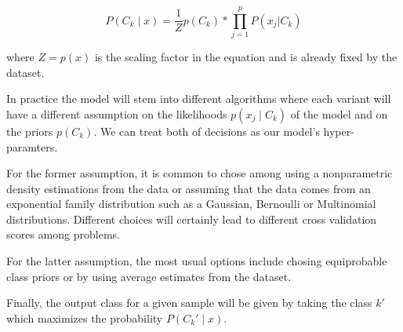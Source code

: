 \documentclass{article}%
\theoremstyle{definition}
\begin{document}
\[
P(C_k \mid x) = \frac{1}{Z} p(C_k) * \prod_{j=1}^{p}    P(x_j | C_k)
\]\label{equation-posteriorProbabilityDecomposition3}

where $Z = p(x)$ is the scaling factor in the equation and is already fixed by the dataset.

In practice the model will stem into different algorithms where each variant will have a different assumption on the likelihoods $p(x_j \mid C_k)$ of the model and on the priors $p(C_k)$. We can treat both of decisions as our model's hyper-paramters.

For the former assumption, it is common to chose among using a nonparametric density estimations from the data or assuming that the data comes from an exponential family distribution such as a Gaussian, Bernoulli or Multinomial distributions. Different choices will certainly lead to different cross validation scores among problems.

For the latter assumption, the most usual options include chosing equiprobable class priors or by using average estimates from the dataset.

Finally, the output class for a given sample will be given by taking the class $k'$ which maximizes the probability  $P(C_k' \mid x)$. 

\textit{}

\textit{}

\textit{}
\end{document}
